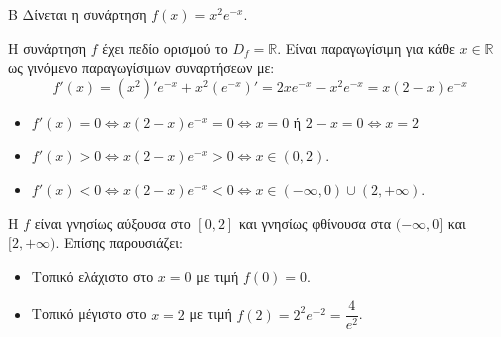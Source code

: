 \begin{thema}{Β}
Δίνεται η συνάρτηση $f(x) = x^2 e^{-x}$.

\begin{erwthma}
\item Η συνάρτηση $f$ έχει πεδίο ορισμού το $D_f = \mathbb{R}$.
Είναι παραγωγίσιμη για κάθε $x \in \mathbb{R}$ ως γινόμενο παραγωγίσιμων συναρτήσεων με:
\[ f'(x) = (x^2)' e^{-x} + x^2 (e^{-x})' = 2x e^{-x} - x^2 e^{-x} = x(2-x)e^{-x} \]
\begin{itemize}
    \item $f'(x)=0\Leftrightarrow x(2-x)e^{-x}=0\Leftrightarrow x=0$ ή $2-x=0\Leftrightarrow x=2$
    \item $f'(x)>0\Leftrightarrow x(2-x)e^{-x}>0\Leftrightarrow x\in(0,2)$.
	\item $f'(x)<0\Leftrightarrow x(2-x)e^{-x}<0\Leftrightarrow x\in(-\infty,0)\cup(2,+\infty)$.
\begin{center}
\end{center}
\end{itemize}
Η $f$ είναι γνησίως αύξουσα στο $[0,2]$ και γνησίως φθίνουσα στα $(-\infty,0]$ και $[2,+\infty)$. Επίσης παρουσιάζει:
\begin{itemize}
    \item Τοπικό ελάχιστο στο $x=0$ με τιμή $f(0) = 0$.
    \item Τοπικό μέγιστο στο $x=2$ με τιμή $f(2) = 2^2 e^{-2} = \dfrac{4}{e^2}$.
\end{itemize}


\end{erwthma}
\end{thema}
